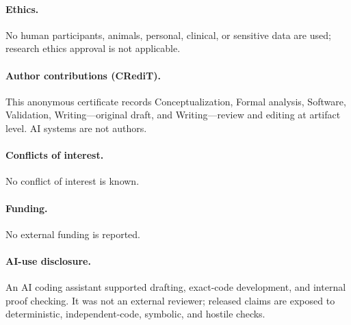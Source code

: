 \documentclass[10pt]{article}
\begin{document}
\paragraph{Ethics.}
No human participants, animals, personal, clinical, or sensitive data are
used; research ethics approval is not applicable.
\paragraph{Author contributions (CRediT).}
This anonymous certificate records Conceptualization, Formal analysis,
Software, Validation, Writing---original draft, and Writing---review and
editing at artifact level.  AI systems are not authors.
\paragraph{Conflicts of interest.} No conflict of interest is known.
\paragraph{Funding.} No external funding is reported.
\paragraph{AI-use disclosure.}
An AI coding assistant supported drafting, exact-code development, and
internal proof checking.  It was not an external reviewer; released claims
are exposed to deterministic, independent-code, symbolic, and hostile checks.
\end{document}

